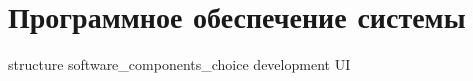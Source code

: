 \section{Программное обеспечение системы}

{structure}
{software_components_choice}
{development}
{UI}

\newpage
